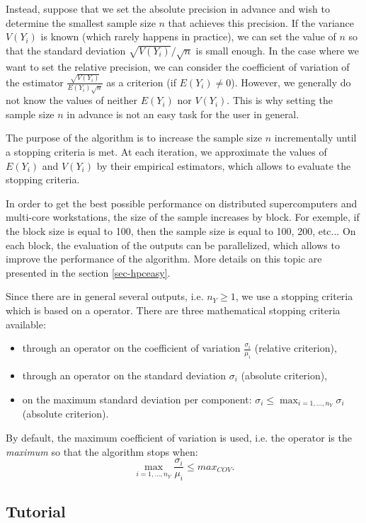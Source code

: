 \documentclass{uncecomp2019}
\begin{document}
Instead, suppose that we set the absolute precision in advance and wish to determine the smallest sample 
size $n$ that achieves this precision. 
If the variance $V(Y_i)$ is known (which rarely happens in practice), we can set the value of $n$ 
so that the standard deviation $\sqrt{V(Y_i)}/\sqrt{n}$ is small enough. 
In the case where we want to set the relative precision, we can consider the coefficient of variation 
of the estimator $\frac{\sqrt{V(Y_i)}}{E(Y_i)\sqrt{n}}$ as a criterion (if $E(Y_i)\neq 0$). 
However, we generally do not know the values of neither $E(Y_i)$ nor $V(Y_i)$. 
This is why setting the sample size $n$ in advance is not an easy task for the 
user in general. 

The purpose of the algorithm is to increase the 
sample size $n$ incrementally until a stopping criteria is met. 
At each iteration, we approximate the values of $E(Y_i)$ and $V(Y_i)$ 
by their empirical estimators, which allows to evaluate the stopping criteria. 

In order to get the best possible performance on distributed supercomputers and 
multi-core workstations, the size of the sample increases by block. 
For exemple, if the block size is equal to 100, then the sample size is equal to 100, 
200, etc... 
On each block, the evaluation of the outputs can be parallelized, which allows to improve the 
performance of the algorithm.
More details on this topic are presented in the section \ref{sec-hpceasy}. 

Since there are in general several outputs, i.e. $n_Y\geq 1$, we use 
a stopping criteria which is based on a operator. 
There are three mathematical stopping criteria available:
\begin{itemize} 
\item through an operator on the coefficient of variation $\frac{\sigma_i}{\mu_i}$ (relative criterion),
\item through an operator on the standard deviation $\sigma_i$ (absolute criterion),
\item on the maximum standard deviation per component: $\sigma_i \leq \max_{i=1,...,n_Y} \sigma_i$ (absolute criterion).
\end{itemize} 

By default, the maximum coefficient of variation is used, i.e. the operator is the \emph{maximum} 
so that the algorithm stops when: 
$$
\max_{i=1,...,n_Y} \frac{\sigma_i}{\mu_i} \leq max_{COV}.
$$

\subsection{Tutorial}
\end{document}
